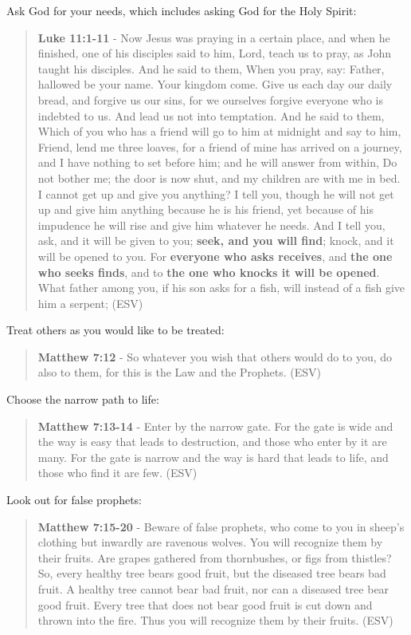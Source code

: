\documentclass[11pt]{article}
\begin{document}
Ask God for your needs, which includes asking God for the Holy Spirit:

\begin{quote}
\textbf{Luke 11:1-11} - Now Jesus was praying in a certain place, and when he finished, one of his disciples said to him, Lord, teach us to pray, as John taught his disciples. And he said to them, When you pray, say: Father, hallowed be your name. Your kingdom come. Give us each day our daily bread, and forgive us our sins, for we ourselves forgive everyone who is indebted to us. And lead us not into temptation. And he said to them, Which of you who has a friend will go to him at midnight and say to him, Friend, lend me three loaves, for a friend of mine has arrived on a journey, and I have nothing to set before him; and he will answer from within, Do not bother me; the door is now shut, and my children are with me in bed. I cannot get up and give you anything? I tell you, though he will not get up and give him anything because he is his friend, yet because of his impudence he will rise and give him whatever he needs. And I tell you, ask, and it will be given to you; \textbf{seek, and you will find}; knock, and it will be opened to you. For \textbf{everyone who asks receives}, and \textbf{the one who seeks finds}, and to \textbf{the one who knocks it will be opened}. What father among you, if his son asks for a fish, will instead of a fish give him a serpent; (ESV)
\end{quote}

Treat others as you would like to be treated:

\begin{quote}
\textbf{Matthew 7:12} - So whatever you wish that others would do to you, do also to them, for this is the Law and the Prophets. (ESV)
\end{quote}

Choose the narrow path to life:

\begin{quote}
\textbf{Matthew 7:13-14} - Enter by the narrow gate. For the gate is wide and the way is easy that leads to destruction, and those who enter by it are many. For the gate is narrow and the way is hard that leads to life, and those who find it are few. (ESV)
\end{quote}

Look out for false prophets:

\begin{quote}
\textbf{Matthew 7:15-20} - Beware of false prophets, who come to you in sheep's clothing but inwardly are ravenous wolves. You will recognize them by their fruits. Are grapes gathered from thornbushes, or figs from thistles? So, every healthy tree bears good fruit, but the diseased tree bears bad fruit. A healthy tree cannot bear bad fruit, nor can a diseased tree bear good fruit. Every tree that does not bear good fruit is cut down and thrown into the fire. Thus you will recognize them by their fruits. (ESV)
\end{quote}
\end{document}
